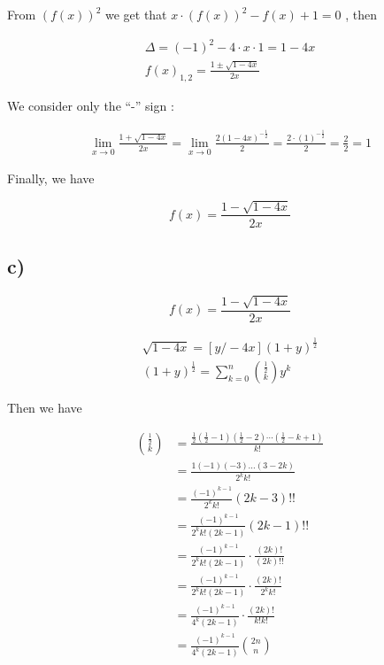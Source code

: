 \documentclass[a4paper,11pt]{report}
\begin{document}
From $(f(x))^2$ we get that $x \cdot (f(x))^2 - f(x) + 1 = 0$ , then

\begin{gather*}
  \Delta = (-1)^2 - 4 \cdot x \cdot 1 = 1 - 4x \\
  f(x)_{1,2} = \frac{1 \pm \sqrt{1-4x}}{2x}
\end{gather*}

We consider only the ``-'' sign :

\begin{gather*}
  \lim_{x \to 0} \frac{1 + \sqrt{1-4x}}{2x} = \lim_{x \to 0}
  \frac{2(1-4x)^{-\frac{1}{2}}}{2} = \frac{2 \cdot (1)^{-\frac{1}{2}}}{2} =
  \frac{2}{2} = 1
\end{gather*}

Finally, we have

\[
  f(x) = \frac{1-\sqrt{1-4x}}{2x}
\]

\subsection*{c)}

\[
  f(x) = \frac{1-\sqrt{1-4x}}{2x}
\]

\begin{gather*}
  \sqrt{1-4x} = [y/-4x] (1+y)^{\frac{1}{2}} \\
  (1+y)^{\frac{1}{2}} = \sum_{k = 0}^{n} \binom{\frac{1}{2}}{k}y^k
\end{gather*}

Then we have

\begin{align*}
  \binom{\frac{1}{2}}{k} &= \frac{\frac{1}{2}(\frac{1}{2}-1)(\frac{1}{2}-2)\cdots(\frac{1}{2}-k+1)}{k!}\\
                         &= \frac{1(-1)(-3)\dots(3-2k)}{2^kk!}\\
                         &= \frac{(-1)^{k-1}}{2^kk!}(2k-3)!!\\
                         &= \frac{(-1)^{k-1}}{2^kk!(2k-1)}(2k-1)!!\\
                         &= \frac{(-1)^{k-1}}{2^kk!(2k-1)}\cdot\frac{(2k)!}{(2k)!!}\\
                         &= \frac{(-1)^{k-1}}{2^kk!(2k-1)}\cdot\frac{(2k)!}{2^kk!}\\
                         &= \frac{(-1)^{k-1}}{4^k(2k-1)}\cdot\frac{(2k)!}{k!k!}\\
                         &= \frac{(-1)^{k-1}}{4^k(2k-1)}\binom{2n}{n}\\
\end{align*}
\end{document}
